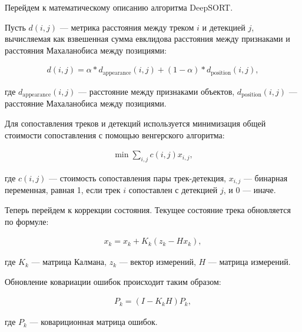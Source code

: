 Перейдем к математическому описанию алгоритма DeepSORT.

Пусть ${d}(i,j)$ — метрика расстояния между треком $i$ и детекцией $j$, вычисляемая как взвешенная сумма евклидова расстояния между признаками и расстояния Махаланобиса между позициями:

\begin{equation}
    \begin{aligned}
        {d}(i, j) = \alpha*{d}_{\text{appearance}}(i, j) + (1 - \alpha)*{d}_{\text{position}}(i, j),
    \end{aligned}
\end{equation}

где ${d}_{\text{appearance}}(i, j)$ — расстояние между признаками объектов, ${d}_{\text{position}}(i, j)$ — расстояние Махаланобиса между позициями.

Для сопоставления треков и детекций используется минимизация общей стоимости сопоставления с помощью венгерского алгоритма:

\begin{equation}
    \begin{aligned}
        \min \sum_{i, j} c(i, j) x_{i,j},
    \end{aligned}
\end{equation}

где $c(i, j)$ — стоимость сопоставления пары трек-детекция, $x_{i,j}$ — бинарная переменная, равная 1, если трек $i$ сопоставлен с детекцией $j$, и 0 — иначе.

Теперь перейдем к коррекции состояния. Текущее состояние трека обновляется по формуле:

\begin{equation}
    \begin{aligned}
        {x}_k = {x}_k + {K}_k ({z}_k - {H} {x}_k),
    \end{aligned}
\end{equation}

где ${K}_k$ — матрица Калмана, ${z}_k$ — вектор измерений, ${H}$ — матрица измерений.

Обновление ковариации ошибок происходит таким образом:

\begin{equation}
    \begin{aligned}
        {P}_k = ({I} - {K}_k {H}) {P}_k,
    \end{aligned}
\end{equation}

где ${P}_k$ — ковариционная матрица ошибок.

